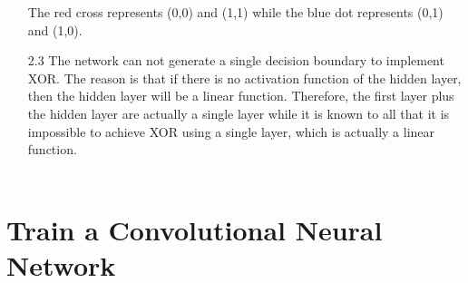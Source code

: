 \documentclass{article}
\begin{document}
\begin{enumerate}
		The red cross represents (0,0) and (1,1) while the blue dot represents (0,1) and (1,0).
		
		\item[2.3] The network can not generate a single decision boundary to implement XOR. The reason is that if there is no activation function of the hidden layer, then the hidden layer will be a linear function. Therefore, the first layer plus the hidden layer are actually a single layer while it is known to all that it is impossible to achieve XOR using a single layer, which is actually a linear function.\\\\
		
    \end{enumerate}
    
    \section{Train a Convolutional Neural Network}
    \noindent
\end{document}

